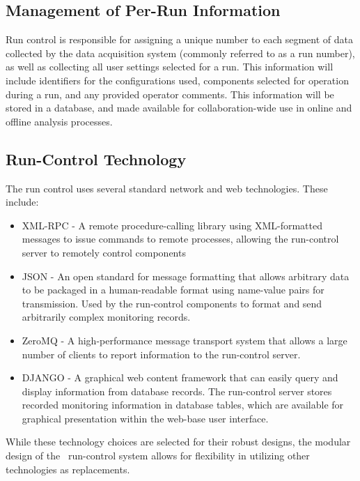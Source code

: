 \subsection{Management of Per-Run Information}

Run control is responsible for assigning a
unique number to each segment of data collected by the data acquisition
system (commonly referred to as a run number), as well as collecting
all user settings selected for a run.  This information will include
identifiers for the configurations used, components selected for operation
during a run, and any provided operator comments.  This information
will be stored in a database, and made available for
collaboration-wide use in online and offline analysis processes.

\subsection{Run-Control Technology}
The run control uses several standard network and
web technologies.  These include:
\begin{itemize}
\item{XML-RPC - A remote procedure-calling library using XML-formatted 
messages to issue commands to remote processes, allowing
    the run-control server to remotely control components}
\item{JSON - An open standard for message formatting that allows
    arbitrary data to be packaged in a human-readable format using
    name-value pairs for transmission.  Used by the run-control
    components to format and send arbitrarily complex monitoring
    records.}
\item{ZeroMQ - A high-performance message transport system that allows
    a large number of clients to report information to the run-control
    server.}
\item{DJANGO - A graphical web content framework that can easily query
    and display information from database records.  The run-control server
    stores recorded monitoring information in database tables, which
    are available for graphical presentation within the web-base user
    interface.}
\end{itemize}
While these technology choices are selected for their robust designs,
the modular design of the \LBNE\ run-control system allows for
flexibility in utilizing other technologies as replacements.

